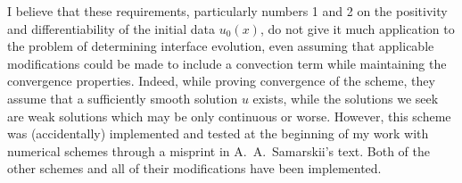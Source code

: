 \documentclass[12pt, reqno]{amsart}
\begin{document}
I believe that these requirements, particularly numbers 1 and 2 on the positivity and differentiability of the initial data $u_{0}(x)$, do not give it much application to the problem of determining interface evolution, even assuming that applicable modifications could be made to include a convection term while maintaining the convergence properties.
Indeed, while proving convergence of the scheme, they assume that a sufficiently smooth solution $u$ exists, while the solutions we seek are weak solutions which may be only continuous or worse.
However, this scheme was (accidentally) implemented and tested at the beginning of my work with numerical schemes through a misprint in A.\ A.\ Samarskii's text.
Both of the other schemes and all of their modifications have been implemented.




\end{document}
